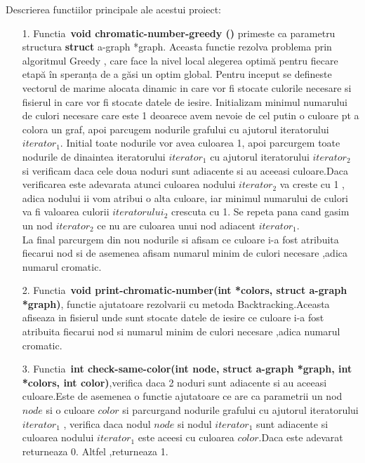 \documentclass[12pt]{article}
\begin{document}
\pagebreak


Descrierea functiilor principale ale acestui proiect:
\begin{enumerate}
  \item [1.]Functia\ {\bf void chromatic-number-greedy ()} primeste ca parametru structura {\bf struct} a-graph *graph. Aceasta functie rezolva problema prin algoritmul Greedy , care face la nivel local alegerea optimă pentru fiecare etapă în speranța de a găsi un optim global. Pentru inceput se defineste vectorul de marime alocata dinamic in care vor fi stocate culorile necesare si fisierul in care vor fi stocate datele de iesire. Initializam minimul numarului de culori necesare care este 1 deoarece avem nevoie de cel putin o culoare pt a colora un graf, apoi parcugem nodurile grafului cu ajutorul iteratorului $iterator_1$. Initial toate nodurile vor avea culoarea 1, apoi parcurgem toate nodurile de dinaintea iteratorului $iterator_1$ cu ajutorul iteratorului $iterator_2$ si verificam daca cele doua noduri sunt adiacente si au aceeasi culoare.Daca verificarea este adevarata atunci culoarea nodului $iterator_2$ va creste cu 1 , adica nodului ii vom atribui o alta culoare, iar minimul numarului de culori va fi valoarea culorii $iteratorului_2$ crescuta cu 1. Se repeta pana cand gasim un nod $iterator_2$ ce nu are culoarea unui nod adiacent $iterator_1$.\\
  La final parcurgem din nou nodurile si afisam ce culoare i-a fost atribuita fiecarui nod si de asemenea afisam numarul minim de culori necesare ,adica numarul cromatic.
  \item [2.]Functia\ {\bf void print-chromatic-number(int *colors, struct a-graph *graph)}, functie ajutatoare rezolvarii cu metoda Backtracking.Aceasta afiseaza in fisierul unde sunt stocate datele de iesire ce culoare i-a fost atribuita fiecarui nod si numarul minim de culori necesare ,adica numarul cromatic.
  
  \item [3.]Functia\ {\bf int check-same-color(int node, struct a-graph *graph, int *colors, int color)},verifica daca 2 noduri sunt adiacente si au aceeasi culoare.Este de asemenea o functie ajutatoare ce are ca parametrii un nod $node$ si o culoare $color$ si parcurgand nodurile grafului cu ajutorul iteratorului $iterator_1$ , verifica daca nodul $node$ si nodul $iterator_1$ sunt adiacente si culoarea nodului $iterator_1$ este aceesi cu culoarea $color$.Daca este adevarat returneaza 0. Altfel ,returneaza 1.
  

\end{enumerate}
\end{document}
